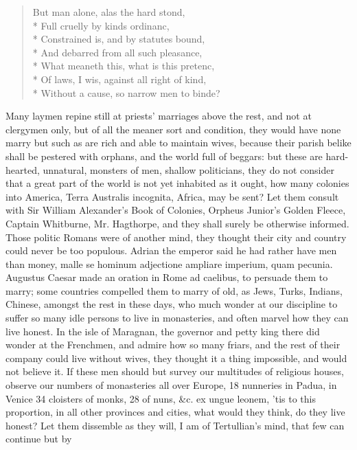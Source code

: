 {{\begin{verse}
But man alone, alas the hard stond,\\*
Full cruelly by kinds ordinanc,\\*
Constrained is, and by statutes bound,\\*
And debarred from all such pleasance,\\*
What meaneth this, what is this pretenc,\\*
Of laws, I wis, against all right of kind,\\*
Without a cause, so narrow men to binde?
\end{verse}
}

Many laymen repine still at priests' marriages above the rest, and not
at clergymen only, but of all the meaner sort and condition, they would
have none marry but such as are rich and able to maintain wives,
because their parish belike shall be pestered with orphans, and the
world full of beggars: but these are hard-hearted, unnatural,
monsters of men, shallow politicians, they do not consider that a
great part of the world is not yet inhabited as it ought, how many
colonies into America, Terra Australis incognita, Africa, may be sent?
Let them consult with Sir William Alexander's Book of Colonies, Orpheus
Junior's Golden Fleece, Captain Whitburne, Mr. Hagthorpe, \etc{} and they
shall surely be otherwise informed. Those politic Romans were of
another mind, they thought their city and country could never be too
populous. Adrian the emperor said he had rather have men than
money, malle se hominum adjectione ampliare imperium, quam pecunia.
Augustus Caesar made an oration in Rome ad caelibus, to persuade them
to marry; some countries compelled them to marry of old, as Jews,
Turks, Indians, Chinese, amongst the rest in these days, who much
wonder at our discipline to suffer so many idle persons to live in
monasteries, and often marvel how they can live honest. In the
isle of Maragnan, the governor and petty king there did wonder at the
Frenchmen, and admire how so many friars, and the rest of their company
could live without wives, they thought it a thing impossible, and would
not believe it. If these men should but survey our multitudes of
religious houses, observe our numbers of monasteries all over Europe,
18 nunneries in Padua, in Venice 34 cloisters of monks, 28 of nuns, \&c.
ex ungue leonem, 'tis to this proportion, in all other provinces and
cities, what would they think, do they live honest? Let them dissemble
as they will, I am of Tertullian's mind, that few can continue but by
}
